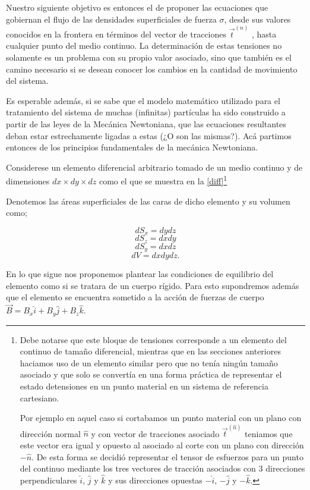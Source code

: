 \documentclass[../notas medios.tex]{subfiles}
\begin{document}
Nuestro siguiente objetivo es entonces el de proponer las ecuaciones que gobiernan el flujo de las densidades superficiales de fuerza $\sigma$, desde sus valores conocidos en la frontera en términos del vector de tracciones ${\vec t^{(n)}}$ , hasta cualquier punto del medio continuo.  La determinación de estas tensiones no solamente es un problema con su propio valor asociado, sino que también es el camino necesario si se desean conocer los cambios en la cantidad de movimiento del sistema.

Es esperable además, si se sabe que el modelo matemático utilizado para el tratamiento del sistema de muchas (infinitas) partículas ha sido construido a partir de las leyes de la Mecánica Newtoniana, que las ecuaciones resultantes deban estar estrechamente ligadas a estas (¿O son las mismas?).  Acá partimos entonces de los principios fundamentales de la mecánica Newtoniana.

Considerese un elemento diferencial arbitrario tomado de un medio continuo y de dimensiones $dx \times dy \times dz$ como el que se muestra en la \cref{diff}\footnote{Debe notarse que este bloque de tensiones corresponde a un elemento del continuo de tamaño diferencial, mientras que en las secciones anteriores haciamos uso de un elemento similar pero que no tenía ningún tamaño asociado y que solo se convertía en una forma práctica de representar el estado detensiones en un punto material en un sistema de referencia cartesiano.

Por ejemplo en aquel caso si cortabamos un punto material con un plano con dirección normal $\hat{n}$ y con vector de tracciones asociado ${\vec t^{(\hat n)}}$ teniamos que este vector era igual y opuesto al asociado al corte con un plano con dirección $-\hat{n}$. De esta forma se decidió representar el tensor de esfuerzos para un punto del continuo mediante los tres vectores de tracción asociados con  3 direcciones perpendiculares $\hat{i}$, $\hat{j}$ y $\hat{k}$ y sus direcciones opuestas $-\hat{i}$, $-\hat{j}$ y $-\hat{k}$.}

Denotemos las áreas superficiales de las caras de dicho elemento y su volumen como;

\[d{S_x} = dydz\]
\[d{S_z} = dxdy\]
\[d{S_y} = dxdz\]
\[dV = dxdydz.\]

En lo que sigue nos proponemos plantear las condiciones de equilibrio del elemento como si se tratara de un cuerpo rígido. Para esto supondremos además que el elemento se encuentra sometido a la acción de fuerzas de cuerpo $\vec B = {B_x}\hat i + {B_y}\hat j + {B_z}\hat k$.
\end{document}
